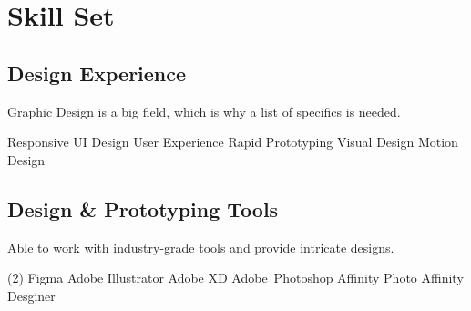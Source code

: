 \section*{Skill Set}
%
%
%
\subsection*{Design Experience}
Graphic Design is a big field, which is why a list of specifics is needed.
\smallskip
\begin{tasks}
  \task Responsive UI Design
  \task User Experience
  \task Rapid Prototyping
  \task Visual Design
  \task Motion Design
\end{tasks}
%
%
\subsection*{Design \& Prototyping Tools}
Able to work with industry-grade tools and provide intricate designs.
\smallskip
\begin{tasks}(2)
  \task Figma
  \task Adobe Illustrator
  \task Adobe XD
  \task \mbox{Adobe Photoshop}
  \task Affinity Photo
  \task Affinity Desginer
\end{tasks}
